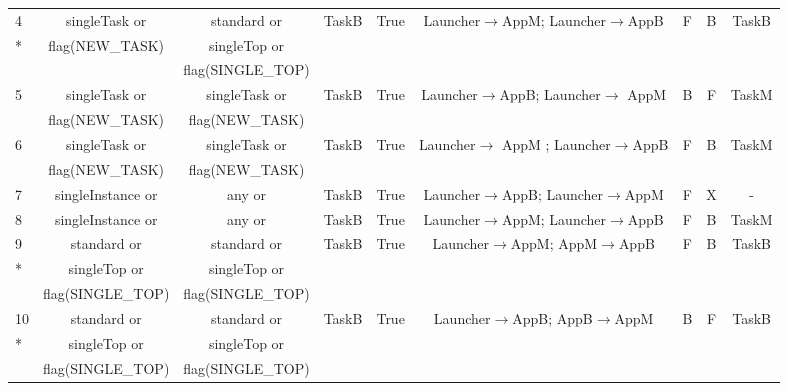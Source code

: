 \documentclass[letterpaper,12pt]{article}
\begin{document}
\begin{table}
{\begin{tabular}{|l|c|c|c|c|c|c|c|c|}
\hline
4  &  singleTask or & standard or & TaskB  & True
   & Launcher$\rightarrow$AppM; Launcher$\rightarrow$AppB    & F & B & TaskB \\

*  & flag(NEW\_TASK) & singleTop or & &
   &                                   &   &   &  \\

   &                 & flag(SINGLE\_TOP) & &
   &                                   &   &   &  \\

\hline
5  &  singleTask or & singleTask or & TaskB  & True
   & Launcher$\rightarrow$AppB; Launcher$\rightarrow$ AppM     & B & F & TaskM \\

   & flag(NEW\_TASK) & flag(NEW\_TASK) & &
   &                                   &   &   &  \\
\hline

6  &  singleTask or & singleTask or & TaskB  & True
   & Launcher$\rightarrow$ AppM ; Launcher$\rightarrow$AppB    & F & B & TaskM \\

   & flag(NEW\_TASK) & flag(NEW\_TASK) & &
   &                                   &   &   &  \\
\hline

7  &  singleInstance or & any or & TaskB  & True
   & Launcher$\rightarrow$AppB; Launcher$\rightarrow$AppM    & F & X & - \\
\hline

8  &  singleInstance or & any or & TaskB  & True
   & Launcher$\rightarrow$AppM; Launcher$\rightarrow$AppB    & F & B & TaskM \\
\hline

9  &  standard or & standard or & TaskB  & True
   & Launcher$\rightarrow$AppM; AppM$\rightarrow$AppB  & F & B & TaskB \\

*   &  singleTop or & singleTop or &        &
   &                                   &   &   &  \\

   & flag(SINGLE\_TOP) & flag(SINGLE\_TOP) & &
   &                                   &   &   &  \\
\hline

10  &  standard or & standard or & TaskB  & True
   & Launcher$\rightarrow$AppB; AppB$\rightarrow$AppM  & B & F & TaskB \\

*   &  singleTop or & singleTop or &        &
   &                                   &   &   &  \\

   & flag(SINGLE\_TOP) & flag(SINGLE\_TOP) & &
   &                                   &   &   &  \\
\hline
\end{tabular}
}
\end{table}
\end{document}
